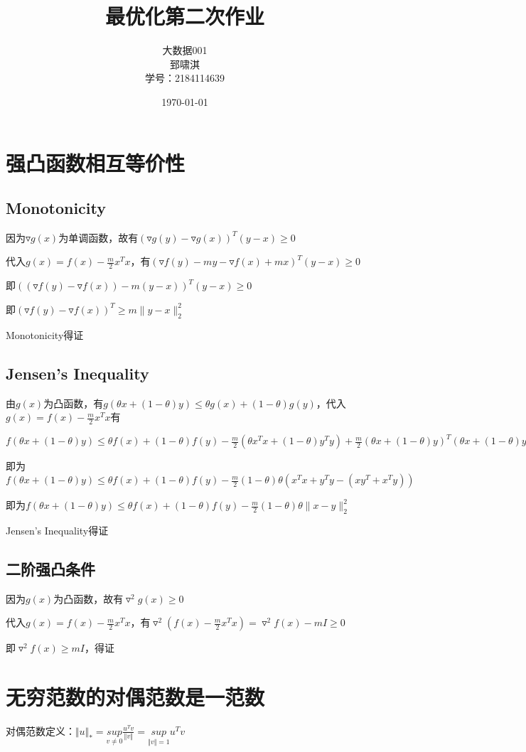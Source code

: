 \documentclass[12pt, a4paper, oneside, fontset=windows]{ctexart}
\title{\textbf{最优化第二次作业}}
\author{大数据001\\郅啸淇\\学号：2184114639}
\date{\today}
\begin{document}
\maketitle
\newpage
\tableofcontents
\newpage
\section{强凸函数相互等价性}
\subsection{Monotonicity}
因为$\triangledown g(x)$为单调函数，故有$(\triangledown g(y) - \triangledown g(x))^{T}(y - x) \geq  0$

代入$g(x) = f(x) - \frac{m}{2}x^{T}x$，有$(\triangledown f(y) - my -\triangledown f(x) + mx)^{T}(y-x) \geq 0$

即$((\triangledown f(y) - \triangledown f(x)) - m(y -x))^{T}(y-x) \geq 0$

即$(\triangledown f(y) - \triangledown f(x))^{T} \geq m\| y - x\|^{2}_{2} $

Monotonicity得证
\subsection{Jensen's Inequality}
由$g(x)$为凸函数，有$g(\theta x + (1-\theta )y) \leq \theta g(x) + (1-\theta)g(y)$，代入$g(x) = f(x) - \frac{m}{2}x^{T}x$有

$f(\theta x + (1-\theta)y) \leq \theta f(x) + (1-\theta) f(y) - \frac{m}{2}(\theta x^{T}x + (1-\theta) y^{T}y) + \frac{m}{2}(\theta x + (1-\theta)y)^{T}(\theta x + (1-\theta)y)$

即为$f(\theta x + (1-\theta)y) \leq \theta f(x) + (1-\theta) f(y) - \frac{m}{2}(1-\theta)\theta(x^{T}x + y^{T}y -(xy^{T}+x^{T}y))$

即为$f(\theta x + (1-\theta)y) \leq \theta f(x) + (1-\theta) f(y) - \frac{m}{2}(1-\theta)\theta \|x - y\|^{2}_{2}$

Jensen's Inequality得证
\subsection{二阶强凸条件}
因为$g(x)$为凸函数，故有$\triangledown ^{2} g(x) \geq 0$

代入$g(x) = f(x) - \frac{m}{2}x^{T}x$，有$\triangledown^{2}(f(x) - \frac{m}{2}x^{T}x) = \triangledown^{2} f(x) - mI \geq 0$

即$\triangledown ^{2} f(x) \geq mI$，得证
\section{无穷范数的对偶范数是一范数}
对偶范数定义：$\Vert u\Vert_{*}=\underset{v\neq 0}{sup}\frac{u^{T}v}{\Vert v\Vert}=\underset{\Vert v\Vert=1}{sup}u^{T}v$
\end{document}
